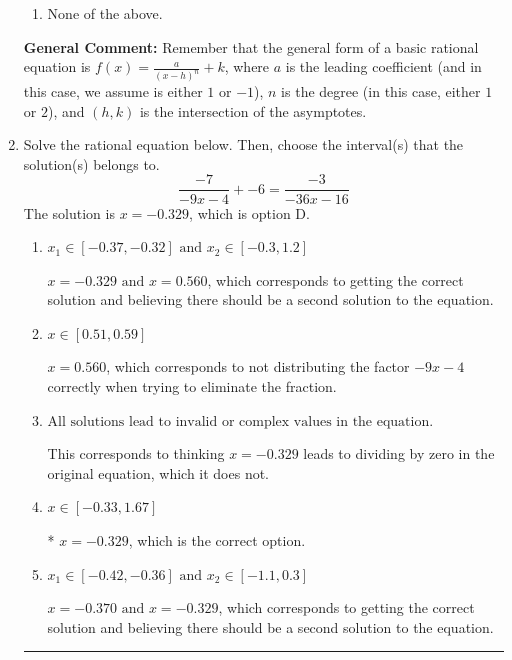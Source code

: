 \documentclass{extbook}[14pt]
\newcommand{\litem}[1]{\item #1

\rule{\textwidth}{0.4pt}}
\begin{document}
\begin{enumerate}
{\begin{enumerate}[label=\Alph*.]
\item None of the above.\end{enumerate}
\textbf{General Comment:} Remember that the general form of a basic rational equation is $ f(x) = \frac{a}{(x-h)^n} + k$, where $a$ is the leading coefficient (and in this case, we assume is either $1$ or $-1$), $n$ is the degree (in this case, either $1$ or $2$), and $(h, k)$ is the intersection of the asymptotes.
}
\litem{
Solve the rational equation below. Then, choose the interval(s) that the solution(s) belongs to.
\[ \frac{-7}{-9x -4} + -6 = \frac{-3}{-36x -16} \]The solution is \( x = -0.329 \), which is option D.\begin{enumerate}[label=\Alph*.]
\item \( x_1 \in [-0.37, -0.32] \text{ and } x_2 \in [-0.3,1.2] \)

$x = -0.329 \text{ and } x = 0.560$, which corresponds to getting the correct solution and believing there should be a second solution to the equation.
\item \( x \in [0.51,0.59] \)

$x = 0.560$, which corresponds to not distributing the factor $-9x -4$ correctly when trying to eliminate the fraction.
\item \( \text{All solutions lead to invalid or complex values in the equation.} \)

This corresponds to thinking $x = -0.329$ leads to dividing by zero in the original equation, which it does not.
\item \( x \in [-0.33,1.67] \)

* $x = -0.329$, which is the correct option.
\item \( x_1 \in [-0.42, -0.36] \text{ and } x_2 \in [-1.1,0.3] \)

$x = -0.370 \text{ and } x = -0.329$, which corresponds to getting the correct solution and believing there should be a second solution to the equation.
\end{enumerate}

}
\end{enumerate}
\end{document}
